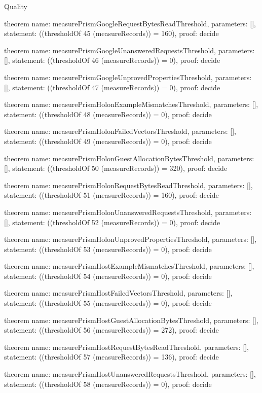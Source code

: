 \begin{lexlean}{Quality}
\begin{semanticmodule}
theorem{
  name: measurePrismGoogleRequestBytesReadThreshold,
  parameters: [],
  statement: ((thresholdOf 45 (measureRecords)) = 160),
  proof: decide{}
}

theorem{
  name: measurePrismGoogleUnansweredRequestsThreshold,
  parameters: [],
  statement: ((thresholdOf 46 (measureRecords)) = 0),
  proof: decide{}
}

theorem{
  name: measurePrismGoogleUnprovedPropertiesThreshold,
  parameters: [],
  statement: ((thresholdOf 47 (measureRecords)) = 0),
  proof: decide{}
}

theorem{
  name: measurePrismHolonExampleMismatchesThreshold,
  parameters: [],
  statement: ((thresholdOf 48 (measureRecords)) = 0),
  proof: decide{}
}

theorem{
  name: measurePrismHolonFailedVectorsThreshold,
  parameters: [],
  statement: ((thresholdOf 49 (measureRecords)) = 0),
  proof: decide{}
}

theorem{
  name: measurePrismHolonGuestAllocationBytesThreshold,
  parameters: [],
  statement: ((thresholdOf 50 (measureRecords)) = 320),
  proof: decide{}
}

theorem{
  name: measurePrismHolonRequestBytesReadThreshold,
  parameters: [],
  statement: ((thresholdOf 51 (measureRecords)) = 160),
  proof: decide{}
}

theorem{
  name: measurePrismHolonUnansweredRequestsThreshold,
  parameters: [],
  statement: ((thresholdOf 52 (measureRecords)) = 0),
  proof: decide{}
}

theorem{
  name: measurePrismHolonUnprovedPropertiesThreshold,
  parameters: [],
  statement: ((thresholdOf 53 (measureRecords)) = 0),
  proof: decide{}
}

theorem{
  name: measurePrismHostExampleMismatchesThreshold,
  parameters: [],
  statement: ((thresholdOf 54 (measureRecords)) = 0),
  proof: decide{}
}

theorem{
  name: measurePrismHostFailedVectorsThreshold,
  parameters: [],
  statement: ((thresholdOf 55 (measureRecords)) = 0),
  proof: decide{}
}

theorem{
  name: measurePrismHostGuestAllocationBytesThreshold,
  parameters: [],
  statement: ((thresholdOf 56 (measureRecords)) = 272),
  proof: decide{}
}

theorem{
  name: measurePrismHostRequestBytesReadThreshold,
  parameters: [],
  statement: ((thresholdOf 57 (measureRecords)) = 136),
  proof: decide{}
}

theorem{
  name: measurePrismHostUnansweredRequestsThreshold,
  parameters: [],
  statement: ((thresholdOf 58 (measureRecords)) = 0),
  proof: decide{}
}


\end{semanticmodule}
\end{lexlean}
